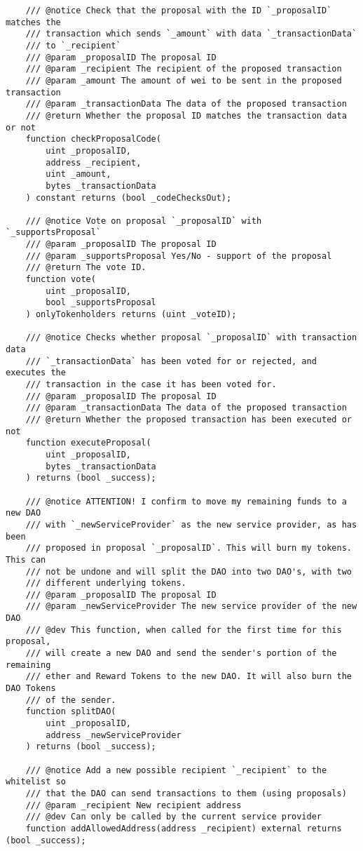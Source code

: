 \documentclass[9pt,oneside]{amsart}
\begin{document}
\begin{appendix}
\begin{verbatim}
    /// @notice Check that the proposal with the ID `_proposalID` matches the
    /// transaction which sends `_amount` with data `_transactionData`
    /// to `_recipient`
    /// @param _proposalID The proposal ID
    /// @param _recipient The recipient of the proposed transaction
    /// @param _amount The amount of wei to be sent in the proposed transaction
    /// @param _transactionData The data of the proposed transaction
    /// @return Whether the proposal ID matches the transaction data or not
    function checkProposalCode(
        uint _proposalID,
        address _recipient,
        uint _amount,
        bytes _transactionData
    ) constant returns (bool _codeChecksOut);

    /// @notice Vote on proposal `_proposalID` with `_supportsProposal`
    /// @param _proposalID The proposal ID
    /// @param _supportsProposal Yes/No - support of the proposal
    /// @return The vote ID.
    function vote(
        uint _proposalID,
        bool _supportsProposal
    ) onlyTokenholders returns (uint _voteID);

    /// @notice Checks whether proposal `_proposalID` with transaction data
    /// `_transactionData` has been voted for or rejected, and executes the
    /// transaction in the case it has been voted for.
    /// @param _proposalID The proposal ID
    /// @param _transactionData The data of the proposed transaction
    /// @return Whether the proposed transaction has been executed or not
    function executeProposal(
        uint _proposalID,
        bytes _transactionData
    ) returns (bool _success);

    /// @notice ATTENTION! I confirm to move my remaining funds to a new DAO
    /// with `_newServiceProvider` as the new service provider, as has been
    /// proposed in proposal `_proposalID`. This will burn my tokens. This can
    /// not be undone and will split the DAO into two DAO's, with two
    /// different underlying tokens.
    /// @param _proposalID The proposal ID
    /// @param _newServiceProvider The new service provider of the new DAO
    /// @dev This function, when called for the first time for this proposal,
    /// will create a new DAO and send the sender's portion of the remaining
    /// ether and Reward Tokens to the new DAO. It will also burn the DAO Tokens
    /// of the sender. 
    function splitDAO(
        uint _proposalID,
        address _newServiceProvider
    ) returns (bool _success);

    /// @notice Add a new possible recipient `_recipient` to the whitelist so
    /// that the DAO can send transactions to them (using proposals)
    /// @param _recipient New recipient address
    /// @dev Can only be called by the current service provider
    function addAllowedAddress(address _recipient) external returns (bool _success);


\end{verbatim}
\end{appendix}
\end{document}
